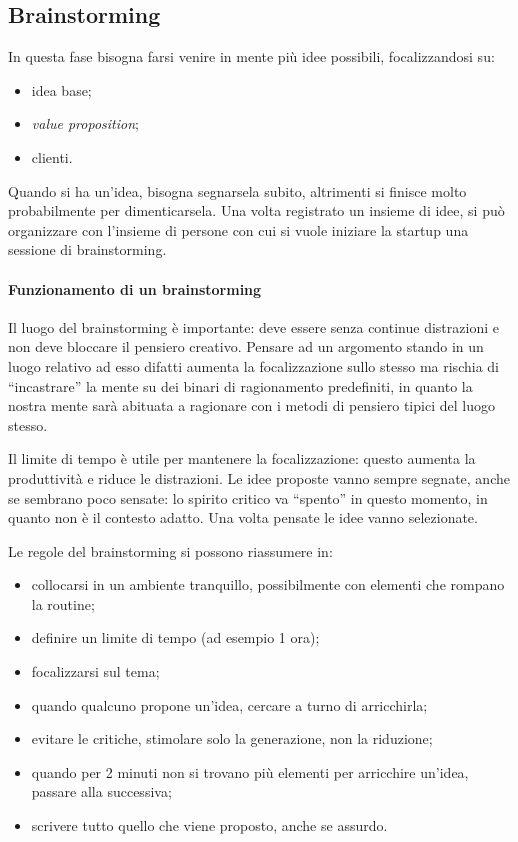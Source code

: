\subsection{Brainstorming}

In questa fase bisogna farsi venire in mente più idee possibili, focalizzandosi
su:
\begin{itemize}
 \item idea base;
 \item \textit{value proposition};
 \item clienti.
\end{itemize}

Quando si ha un'idea, bisogna segnarsela subito, altrimenti si finisce molto
probabilmente per dimenticarsela. Una volta registrato un insieme di idee, si
può organizzare con l'insieme di persone con cui si vuole iniziare la startup
una sessione di brainstorming.

\paragraph*{Funzionamento di un brainstorming}
Il luogo del brainstorming è importante: deve essere senza continue distrazioni
e non deve bloccare il pensiero creativo. Pensare ad un argomento stando in un
luogo relativo ad esso difatti aumenta la focalizzazione sullo stesso ma
rischia di ``incastrare'' la mente su dei binari di ragionamento predefiniti,
in quanto la nostra mente sarà abituata a ragionare con i metodi di pensiero
tipici del luogo stesso.

Il limite di tempo è utile per mantenere la focalizzazione: questo aumenta la
produttività e riduce le distrazioni. Le idee proposte vanno sempre segnate,
anche se sembrano poco sensate: lo spirito critico va ``spento'' in questo
momento, in quanto non è il contesto adatto.
Una volta pensate le idee vanno selezionate.

Le regole del brainstorming si possono riassumere in:

\begin{itemize}
 \item collocarsi in un ambiente tranquillo, possibilmente con elementi che
rompano la routine;
 \item definire un limite di tempo (ad esempio 1 ora);
 \item focalizzarsi sul tema;
 \item quando qualcuno propone un'idea, cercare a turno di arricchirla;
 \item evitare le critiche, stimolare solo la generazione, non la riduzione;
 \item quando per 2 minuti non si trovano più elementi per arricchire un'idea,
passare alla successiva;
 \item scrivere tutto quello che viene proposto, anche se assurdo.
\end{itemize}

